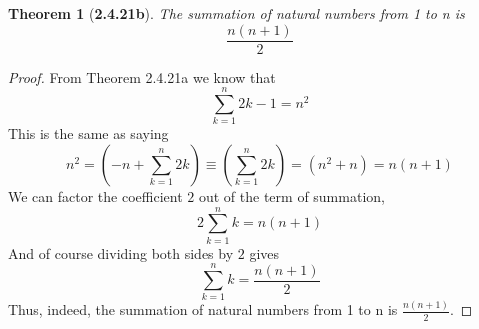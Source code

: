 \documentclass[a4paper, 12pt]{article}
\theoremstyle{plain}
\newtheorem*{theorem*}{Theorem}
\begin{document}
	
\begin{theorem*}[\textbf{2.4.21b}]
    The summation of natural numbers from 1 to n is $$\frac{n(n+1)}{2}$$
\end{theorem*}

\begin{proof}
    From Theorem 2.4.21a we know that $$\sum_{k=1}^{n} 2k - 1 = n^{2}$$
    This is the same as saying 
    $$n^{2} = \left(-n + \sum_{k=1}^{n} 2k \right) \equiv \left(\sum_{k=1}^{n} 2k \right) = (n^{2} + n) = n(n + 1)$$ 
    We can factor the coefficient $2$ out of the term of summation, 
    $$2 \sum_{k=1}^{n} k = n(n+1)$$
    And of course dividing both sides by $2$ gives 
    $$\sum_{k=1}^{n} k = \frac{n(n+1)}{2}$$ 
    Thus, indeed, the summation of natural numbers 
    from 1 to n is $\frac{n(n+1)}{2}$.
\end{proof}
\end{document}

